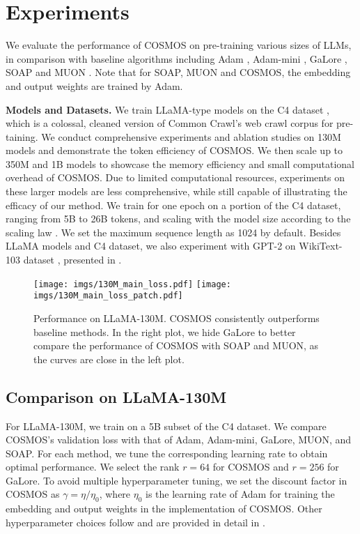 \section{Experiments}\label{experiments}
We evaluate the performance of COSMOS on pre-training various sizes of LLMs, in comparison with baseline algorithms including Adam \citep{kingma2014adam}, Adam-mini \citep{zhang2024adam}, GaLore \citep{zhao2024galore}, SOAP \citep{vyas2024soap} and MUON \citep{jordan2024MUON}. Note that for SOAP, MUON and COSMOS, the embedding and output weights are trained by Adam.


\noindent \textbf{\bf Models and Datasets.} We train LLaMA-type models \citep{touvron2023llama} on the C4 dataset \citep{raffel2020exploring}, which is a colossal, cleaned version of Common Crawl's web crawl corpus for pre-taining. 
We conduct comprehensive experiments and ablation studies on 130M models and demonstrate the token efficiency of COSMOS. 
We then scale up to 350M and 1B models to showcase the memory efficiency and small computational overhead of COSMOS. 
Due to limited computational resources, experiments on these larger models are less comprehensive, while still capable of illustrating the efficacy of our method. 
We train for one epoch on a portion of the C4 dataset, ranging from 5B to 26B tokens, and scaling with the model size according to the scaling law \citep{kaplan2020scaling}. 
We set the maximum sequence length as 1024 by default. 
Besides LLaMA models and C4 dataset, we also experiment with GPT-2 \citep{radford2019language} on WikiText-103 dataset \citep{merity2016pointer}, presented in . 

\begin{figure*}[htb!]
    \centering
    \texttt{[image: imgs/130M\_main\_loss.pdf]}
    \texttt{[image: imgs/130M\_main\_loss\_patch.pdf]}
    \caption{Performance on LLaMA-130M. COSMOS consistently outperforms baseline methods. In the right plot, we hide GaLore to better compare the performance of COSMOS with SOAP and MUON, as the curves are close in the left plot. }
    \label{fig:exp-130m-main}
\end{figure*}

\subsection{Comparison on LLaMA-130M}\label{sec:exp-130m}
For LLaMA-130M, we train on a 5B subset of the C4 dataset. 
We compare COSMOS's validation loss with that of Adam, Adam-mini, GaLore, MUON, and SOAP. 
\vskip2pt
For each method, we tune the corresponding learning rate to obtain optimal performance. 
We select the rank $r=64$ for COSMOS and $r=256$ for GaLore. 
To avoid multiple hyperparameter tuning, we set the discount factor in COSMOS as $\gamma=\eta/\eta_{0}$, where $\eta_0$ is the learning rate of Adam for training the embedding and output weights in the implementation of COSMOS. 
Other hyperparameter choices follow \citet{zhao2024galore} and are provided in detail in . 

